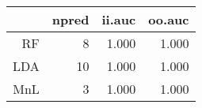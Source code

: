 \begin{table}[ht]
\centering
\begin{tabular}{rrrr}
  \hline
 & npred & ii.auc & oo.auc \\ 
  \hline
RF &    8 & 1.000 & 1.000 \\ 
  LDA &   10 & 1.000 & 1.000 \\ 
  MnL &    3 & 1.000 & 1.000 \\ 
   \hline
\end{tabular}
\label{tab:second_res}
\end{table}
